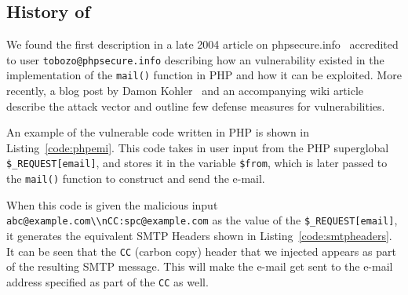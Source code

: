 \subsection{History of \ehi}

We found the first \ehi description in a late 2004 article on phpsecure.info~\cite{Tobozo} accredited to user \lstinline|tobozo@phpsecure.info| describing how an \ehi vulnerability existed in the implementation of the \texttt{mail()} function in PHP and how it can be exploited. More recently, a blog post by Damon Kohler~\cite{DK} and an accompanying wiki article~\cite{Injection} describe the attack vector and outline few defense measures for \ehi vulnerabilities.


An example of the vulnerable code written in PHP is shown in Listing~\ref{code:phpemi}. This code takes in user input from the PHP superglobal \texttt{\$\_REQUEST[\textquotesingle email\textquotesingle]}, and stores it in the variable \texttt{\$from}, which is later passed to the \texttt{mail()} function to construct and send the e-mail.



\begin{sloppypar}
When this code is given the malicious input \texttt{\lstinline{abc@example.com\\nCC:spc@example.com}} as the value of the \texttt{\$\_REQUEST[\textquotesingle email\textquotesingle]}, it generates the equivalent SMTP Headers shown in Listing~\ref{code:smtpheaders}. It can be seen that the \texttt{CC} (carbon copy) header that we injected appears as part of the resulting SMTP message. This will make the e-mail get sent to the e-mail address specified as part of the \texttt{CC} as well. 

%
\end{sloppypar}